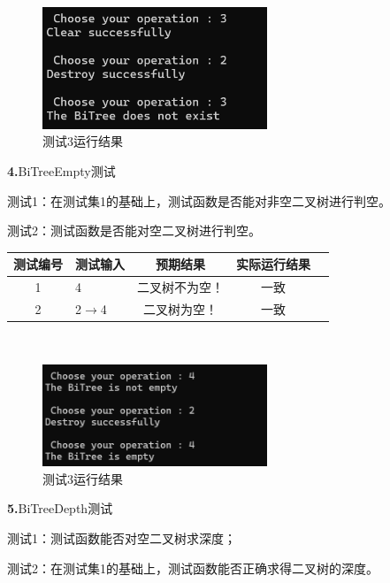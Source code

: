 \documentclass[supercite]{Experimental_Report}
\theoremstyle{definition}
\begin{document}
~\

\begin{figure}[H]
 	\centering
 	\includegraphics[width=0.6\textwidth]{images/二叉树测试3.png}
 	\caption{测试3运行结果}
 	\label{txlab}
 \end{figure}

\noindent\textbf{ 4.}BiTreeEmpty测试

测试1：在测试集1的基础上，测试函数是否能对非空二叉树进行判空。

测试2：测试函数是否能对空二叉树进行判空。

\vspace{0.5em}

\begin{tabular}{|c|l|c|c|c|}
	\hline
	测试编号 & 测试输入 & 预期结果 & 实际运行结果 \\
	\hline
	1 & 4 & 二叉树不为空！ & 一致 \\
	\hline
	2 & 2$\rightarrow$4 & 二叉树为空！ & 一致 \\
	\hline
\end{tabular}

~\

\begin{figure}[H]
 	\centering
 	\includegraphics[width=0.6\textwidth]{images/二叉树测试4.png}
 	\caption{测试3运行结果}
 	\label{txlab}
 \end{figure}

\noindent\textbf{ 5.}BiTreeDepth测试

测试1：测试函数能否对空二叉树求深度；

测试2：在测试集1的基础上，测试函数能否正确求得二叉树的深度。

\vspace{0.5em}
\end{document}
